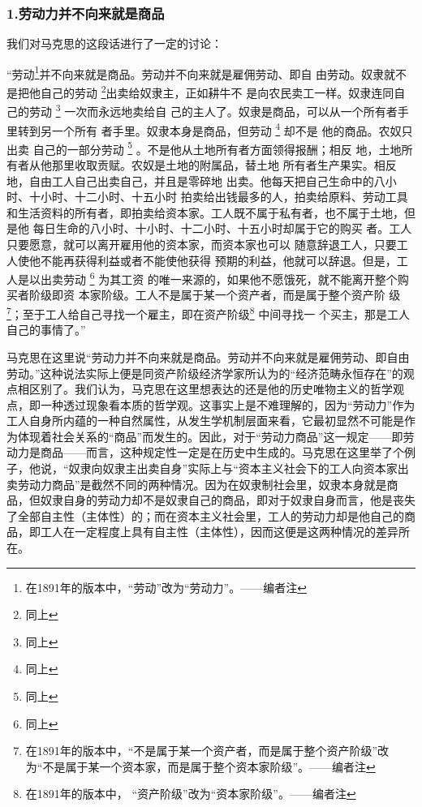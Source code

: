 \documentclass[a4paper,twoside,12pt,AutoFakeBold]{ctexart}
\begin{document}
\subsubsection{1.劳动力并不向来就是商品}
我们对马克思的这段话进行了一定的讨论：
\begin{adjustwidth}{2em}{2em}
    \qquad\fangsong
    “劳动\footnote{在1891年的版本中，“劳动”改为“劳动力”。——编者注}并不向来就是商品。劳动并不向来就是雇佣劳动、即自
由劳动。奴隶就不是把他自己的劳动 \footnote{同上}出卖给奴隶主，正如耕牛不
是向农民卖工一样。奴隶连同自己的劳动 \footnote{同上} 一次而永远地卖给自
己的主人了。奴隶是商品，可以从一个所有者手里转到另一个所有
者手里。奴隶本身是商品，但劳动  \footnote{同上} 却不是 他的商品。农奴只出卖
自己的一部分劳动  \footnote{同上} 。不是他从土地所有者方面领得报酬；相反
地，土地所有者从他那里收取贡赋。农奴是土地的附属品，替土地
所有者生产果实。相反地，自由工人自己出卖自己，并且是零碎地
出卖。他每天把自己生命中的八小时、十小时、十二小时、十五小时
拍卖给出钱最多的人，拍卖给原料、劳动工具和生活资料的所有者，即拍卖给资本家。工人既不属于私有者，也不属于土地，但是他
每日生命的八小时、十小时、十二小时、十五小时却属于它的购买
者。工人只要愿意，就可以离开雇用他的资本家，而资本家也可以
随意辞退工人，只要工人使他不能再获得利益或者不能使他获得
预期的利益，他就可以辞退。但是，工人是以出卖劳动 \footnote{同上} 为其工资
的唯一来源的，如果他不愿饿死，就不能离开整个购买者阶级即资
本家阶级。工人不是属于某一个资产者，而是属于整个资产阶
级\footnote{在1891年的版本中，“不是属于某一个资产者，而是属于整个资产阶级”改为“不是属于某一个资本家，而是属于整个资本家阶级”。——编者注}；至于工人给自己寻找一个雇主，即在资产阶级\footnote{在1891年的版本中， “资产阶级”改为“资本家阶级”。——编者注} 中间寻找一
个买主，那是工人自己的事情了。”
\end{adjustwidth}

马克思在这里说“劳动力并不向来就是商品。劳动并不向来就是雇佣劳动、即自由劳动。”这种说法实际上便是同资产阶级经济学家所认为的“经济范畴永恒存在”的观点相区别了。我们认为，马克思在这里想表达的还是他的历史唯物主义的哲学观点，即一种透过现象看本质的哲学观。这事实上是不难理解的，因为“劳动力”作为工人自身所内蕴的一种自然属性，从发生学机制层面来看，它最初显然不可能是作为体现着社会关系的“商品”而发生的。因此，对于“劳动力商品”这一规定——即劳动力是商品——而言，这种规定性一定是在历史中生成的。马克思在这里举了个例子，他说，“奴隶向奴隶主出卖自身”实际上与“资本主义社会下的工人向资本家出卖劳动力商品”是截然不同的两种情况。因为在奴隶制社会里，奴隶本身就是商品，但奴隶自身的劳动力却不是奴隶自己的商品，即对于奴隶自身而言，他是丧失了全部自主性（主体性）的；而在资本主义社会里，工人的劳动力却是他自己的商品，即工人在一定程度上具有自主性（主体性），因而这便是这两种情况的差异所在。
\end{document}
